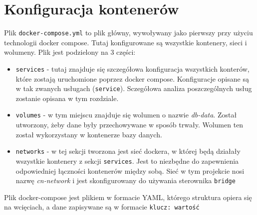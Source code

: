 \chapter{Konfiguracja kontenerów}
Plik \verb|docker-compose.yml| to plik główny, wywoływany jako pierwszy przy użyciu technologii docker compose. Tutaj konfigurowane są wszystkie kontenery, sieci i wolumeny.
Plik jest podzielony na 3 części:
\begin{itemize}
    \item \verb|services| - tutaj znajduje się szczegółowa konfiguracja wszystkich konterów, które zostają uruchomione poprzez docker compose. Konfiguracje opisane są w tak zwanych usługach (\verb|service|). Sczegółowa analiza poszczególnych usług zostanie opisana w tym rozdziale.
    \item \verb|volumes| - w tym miejscu znajduje się wolumen o nazwie \textit{db-data}. Został utworzony, żeby dane były przechowywane w sposób trwały. Wolumen ten został wykorzystany w kontenerze bazy danych.
    \item \verb|networks| - w tej sekcji tworzona jest sieć dockera, w której będą działały wszystkie kontenery z sekcji \verb|services|. Jest to niezbędne do zapewnienia odpowiedniej łączności kontenerów między sobą. Sieć w tym projekcie nosi nazwę \textit{cn-network} i jest skonfigurowany do używania sterownika \verb|bridge|
\end{itemize}

Plik docker-compose jest plikiem w formacie YAML, którego struktura opiera się na wcięciach, a dane zapisywane są w formacie \verb|klucz: wartość|




